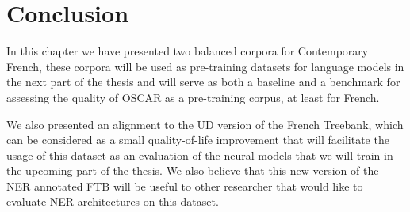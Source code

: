 \section{Conclusion}
In this chapter we have presented two balanced corpora for Contemporary French, these corpora will be used as pre-training datasets for language models in the next part of the thesis and will serve as both a baseline and a benchmark for assessing the quality of OSCAR as a pre-training corpus, at least for French.

We also presented an alignment to the UD version of the French Treebank, which can be considered as a small quality-of-life improvement that will facilitate the usage of this dataset as an evaluation of the neural models that we will train in the upcoming part of the thesis. We also believe that this new version of the NER annotated FTB will be useful to other researcher that would like to evaluate NER architectures on this dataset.
